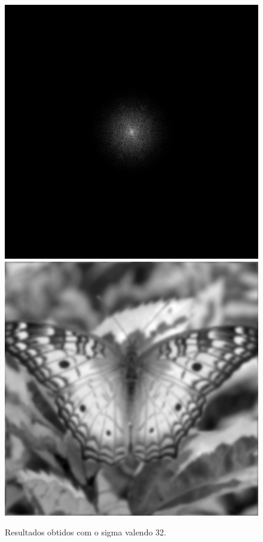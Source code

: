 \documentclass[twoside,twocolumn]{article}
\begin{document}
\begin{figure}[H]
\begin{center}
	\includegraphics[scale=.19]{figures/butterfly_mag_filter_32.png}
	\includegraphics[scale=.19]{figures/butterfly_result_32.png}
\caption{Resultados obtidos com o sigma valendo 32.} \label{mag_64}
\end{center}
\end{figure}
\end{document}
